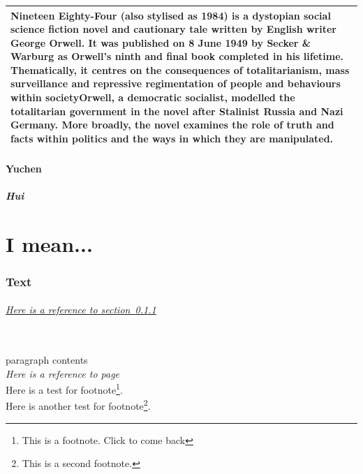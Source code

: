 \documentclass{ctexart}
\begin{document}
      \vspace{1em}
      \begin{center}
            
            \begin{tabular}[]{|p{7cm}|}
            \hline  
            Nineteen Eighty-Four (also stylised as 1984) is a dystopian social science fiction novel and cautionary tale written by English writer George Orwell. It was published on 8 June 1949 by Secker \& Warburg as Orwell's ninth and final book completed in his lifetime. Thematically, it centres on the consequences of totalitarianism, mass surveillance and repressive regimentation of people and behaviours within societyOrwell, a democratic socialist, modelled the totalitarian government in the novel after Stalinist Russia and Nazi Germany. More broadly, the novel examines the role of truth and facts within politics and the ways in which they are manipulated. \\
            \hline
            \end{tabular}
      \end{center}


      \subsection{Yuchen}
            \subsubsection{Hui}
                  \label{ssse:Hui}

\part{I mean...}
\section{Text}
      \paragraph{\underline{Here is a reference to section~\ref{ssse:Hui}}}~{}\\  
            paragraph contents \\
      \emph{Here is a reference to page~\pageref{se:sectionYuchen}}\\
      Here is a test for footnote\footnote{This is a footnote. Click to come back}.\\
      Here is another test for footnote\footnote{This is a second footnote.}.
\end{document}
